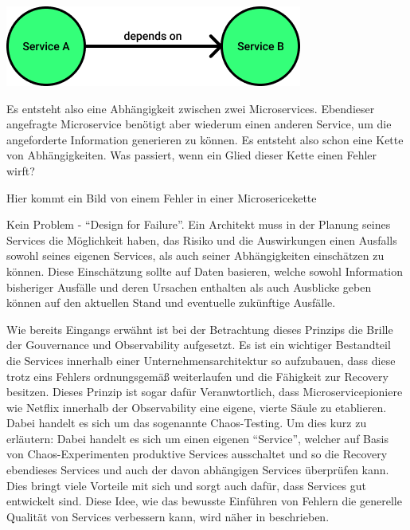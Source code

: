 \documentclass[
	12pt,
	BCOR=5mm,
	DIV=12,
	headinclude=on,
	footinclude=off,
	parskip=half,
	bibliography=totoc,
	listof=entryprefix,
	toc=listof,
	numbers=noenddot,
	plainfootsepline
]{scrreprt}
\begin{document}
\begin{center}
	\includegraphics[width=0.55\linewidth]{img/service_dependency.png}
\end{center}

Es entsteht also eine Abhängigkeit zwischen zwei Microservices. Ebendieser angefragte Microservice benötigt aber wiederum einen anderen Service, um die angeforderte Information generieren zu können. Es entsteht also schon eine Kette von Abhängigkeiten. Was passiert, wenn ein Glied dieser Kette einen Fehler wirft? 

\Large Hier kommt ein Bild von einem Fehler in einer Microsericekette

\normalsize

Kein Problem - \enquote{Design for Failure}. Ein Architekt muss in der Planung seines Services die Möglichkeit haben, das Risiko und die Auswirkungen einen Ausfalls sowohl seines eigenen Services, als auch seiner Abhängigkeiten einschätzen zu können. Diese Einschätzung sollte auf Daten basieren, welche sowohl Information bisheriger Ausfälle und deren Ursachen enthalten als auch Ausblicke geben können auf den aktuellen Stand und eventuelle zukünftige Ausfälle.

Wie bereits Eingangs erwähnt ist bei der Betrachtung dieses Prinzips die Brille der Gouvernance und Observability aufgesetzt. Es ist ein wichtiger Bestandteil die Services innerhalb einer Unternehmensarchitektur so aufzubauen, dass diese trotz eins Fehlers ordnungsgemäß weiterlaufen und die Fähigkeit zur Recovery besitzen. Dieses Prinzip ist sogar dafür Veranwtortlich, dass Microservicepioniere wie Netflix innerhalb der Observability eine eigene, vierte Säule zu etablieren. Dabei handelt es sich um das sogenannte Chaos-Testing. Um dies kurz zu erläutern: Dabei handelt es sich um einen eigenen \enquote{Service}, welcher auf Basis von Chaos-Experimenten produktive Services ausschaltet und so die Recovery ebendieses Services und auch der davon abhängigen Services überprüfen kann. Dies bringt viele Vorteile mit sich und sorgt auch dafür, dass Services gut entwickelt sind. Diese Idee, wie das bewusste Einführen von Fehlern die generelle Qualität von Services verbessern kann, wird näher in \autocite{AntifragileOrganization} beschrieben.
\end{document}
